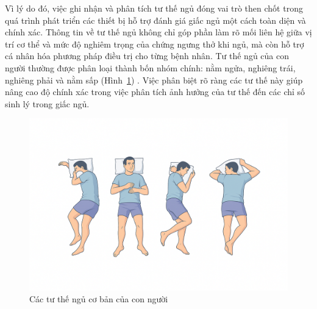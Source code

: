 Vì lý do đó, việc ghi nhận và phân tích tư thế ngủ đóng vai trò then chốt trong quá trình phát triển các thiết bị hỗ trợ đánh giá giấc ngủ một cách toàn diện và chính xác. Thông tin về tư thế ngủ không chỉ góp phần làm rõ mối liên hệ giữa vị trí cơ thể và mức độ nghiêm trọng của chứng ngưng thở khi ngủ, mà còn hỗ trợ cá nhân hóa phương pháp điều trị cho từng bệnh nhân. Tư thế ngủ của con người thường được phân loại thành bốn nhóm chính: nằm ngửa, nghiêng trái, nghiêng phải và nằm sấp (Hình~\ref{4_tuthe}) \cite{4_ngu}. Việc phân biệt rõ ràng các tư thế này giúp nâng cao độ chính xác trong việc phân tích ảnh hưởng của tư thế đến các chỉ số sinh lý trong giấc ngủ.

\begin{figure}
		\centering
 		\includegraphics[width=\textwidth]{images/4ngu.png}
 		\vspace*{-7mm}
		\caption{Các tư thế ngủ cơ bản của con người}
		\label{4_tuthe}
\end{figure}

